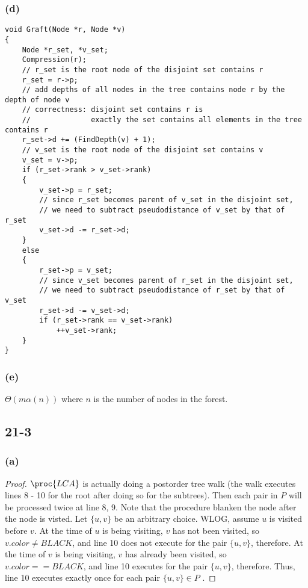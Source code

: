 \subsubsection*{(d)}

\begin{verbatim}
void Graft(Node *r, Node *v)
{
    Node *r_set, *v_set;
    Compression(r);
    // r_set is the root node of the disjoint set contains r
    r_set = r->p;
    // add depths of all nodes in the tree contains node r by the depth of node v
    // correctness: disjoint set contains r is 
    //              exactly the set contains all elements in the tree contains r  
    r_set->d += (FindDepth(v) + 1);
    // v_set is the root node of the disjoint set contains v
    v_set = v->p;
    if (r_set->rank > v_set->rank)
    {
        v_set->p = r_set;
        // since r_set becomes parent of v_set in the disjoint set,
        // we need to subtract pseudodistance of v_set by that of r_set
        v_set->d -= r_set->d;
    }
    else
    {
        r_set->p = v_set;
        // since v_set becomes parent of r_set in the disjoint set,
        // we need to subtract pseudodistance of r_set by that of v_set
        r_set->d -= v_set->d;
        if (r_set->rank == v_set->rank)
            ++v_set->rank;
    }
}
\end{verbatim}

\subsubsection*{(e)}

$\Theta(m \alpha(n))$ where $n$ is the number of nodes in the forest.

\subsection*{21-3}

\subsubsection*{(a)}

\begin{proof}
    $\proc{LCA}$ is actually doing a postorder tree walk
    (the walk executes lines 8 - 10 for the root after doing so for the subtrees).
    Then each pair in $P$ will be processed twice at line 8, 9.
    Note that the procedure blanken the node after the node is visted.
    Let $\{ u, v \}$ be an arbitrary choice.
    WLOG, assume $u$ is visited before $v$.
    At the time of $u$ is being visiting, $v$ has not been visited,
    so $v.color \neq BLACK$, 
    and line 10 does not execute for the pair $\{ u, v \}$, therefore.
    At the time of $v$ is being visiting, $v$ has already been visited,
    so $v.color == BLACK$, 
    and line 10 executes for the pair $\{ u, v \}$, therefore.
    Thus, line 10 executes exactly once for each pair $\{ u, v \} \in P$ .
\end{proof}

